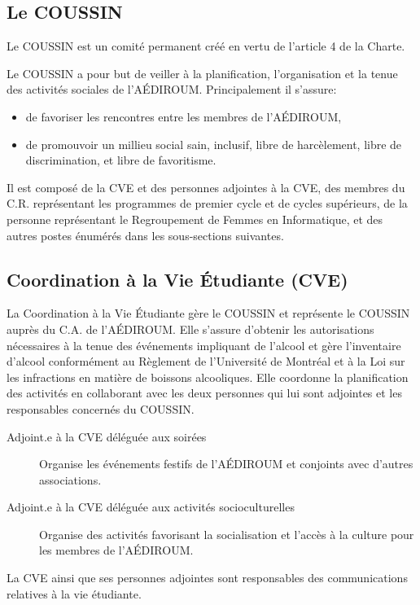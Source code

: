 \documentclass{aediroum}
\begin{document}
\setcounter{subsection}{-1}
\subsection{Le COUSSIN}\label{sec:coussin}
Le COUSSIN est un comité permanent créé en vertu de l'article 4 de la Charte.

Le COUSSIN a pour but de veiller à la planification, l'organisation et la tenue des activités sociales de l'AÉDIROUM. Principalement il s'assure:
\begin{itemize}
	\item de favoriser les rencontres entre les membres de l'AÉDIROUM,
	\item de promouvoir un millieu social sain, inclusif, libre de harcèlement, libre de discrimination, et libre de favoritisme.
\end{itemize}

Il est composé de la CVE et des personnes adjointes à la
CVE, des membres du C.R. représentant les programmes de premier cycle et de cycles
supérieurs, de la personne représentant le Regroupement de Femmes en Informatique,
et des autres postes énumérés dans les sous-sections suivantes.

\subsection{Coordination à la Vie Étudiante (CVE)}\label{sec:cve}
La Coordination à la Vie Étudiante gère le COUSSIN et représente le COUSSIN auprès
du C.A. de l’AÉDIROUM. Elle s’assure d’obtenir les autorisations nécessaires à la tenue
des événements impliquant de l’alcool et gère l’inventaire d’alcool conformément au Règlement
de l’Université de Montréal et à la Loi sur les infractions en matière de boissons
alcooliques. Elle coordonne la planification des activités en collaborant avec les deux
personnes qui lui sont adjointes et les responsables concernés du COUSSIN.

\begin{description}
\item[Adjoint.e à la CVE déléguée aux soirées] Organise les événements festifs de l’AÉDIROUM et conjoints avec d’autres associations.
\item[Adjoint.e à la CVE déléguée aux activités socioculturelles] Organise des activités favorisant la socialisation et l’accès à la culture pour les membres de l’AÉDIROUM.
\end{description}
La CVE ainsi que ses personnes adjointes sont responsables des communications relatives à la vie étudiante.
\end{document}
